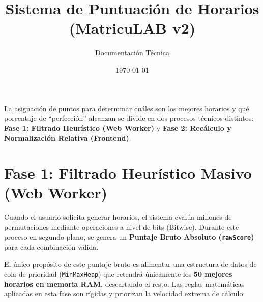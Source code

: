 \documentclass[12pt,a4paper]{article}
\title{\textbf{Sistema de Puntuación de Horarios (MatricuLAB v2)}}
\author{Documentación Técnica}
\date{\today}
\begin{document}
\maketitle

La asignación de puntos para determinar cuáles son los mejores horarios y qué porcentaje de ``perfección'' alcanzan se divide en dos procesos técnicos distintos: \textbf{Fase 1: Filtrado Heurístico (Web Worker)} y \textbf{Fase 2: Recálculo y Normalización Relativa (Frontend)}.

\section{Fase 1: Filtrado Heurístico Masivo (Web Worker)}

Cuando el usuario solicita generar horarios, el sistema evalúa millones de permutaciones mediante operaciones a nivel de bits (Bitwise). Durante este proceso en segundo plano, se genera un \textbf{Puntaje Bruto Absoluto (\texttt{rawScore})} para cada combinación válida. 

El único propósito de este puntaje bruto es alimentar una estructura de datos de cola de prioridad (\texttt{MinMaxHeap}) que retendrá únicamente los \textbf{50 mejores horarios en memoria RAM}, descartando el resto. Las reglas matemáticas aplicadas en esta fase son rígidas y priorizan la velocidad extrema de cálculo:
\end{document}
